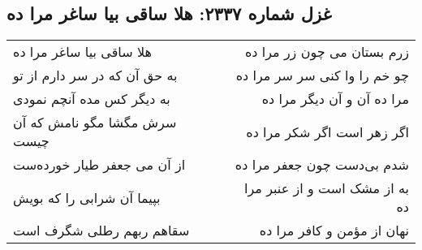 \begin{center}
\section*{غزل شماره ۲۳۳۷: هلا ساقی بیا ساغر مرا ده}
\label{sec:2337}
\begin{longtable}{l p{0.5cm} r}
هلا ساقی بیا ساغر مرا ده
&&
زرم بستان می چون زر مرا ده
\\
به حق آن که در سر دارم از تو
&&
چو خم را وا کنی سر سر مرا ده
\\
به دیگر کس مده آنچم نمودی
&&
مرا ده آن و آن دیگر مرا ده
\\
سرش مگشا مگو نامش که آن چیست
&&
اگر زهر است اگر شکر مرا ده
\\
از آن می جعفر طیار خورده‌ست
&&
شدم بی‌دست چون جعفر مرا ده
\\
بپیما آن شرابی را که بویش
&&
به از مشک است و از عنبر مرا ده
\\
سقاهم ربهم رطلی شگرف است
&&
نهان از مؤمن و کافر مرا ده
\\
\end{longtable}
\end{center}
